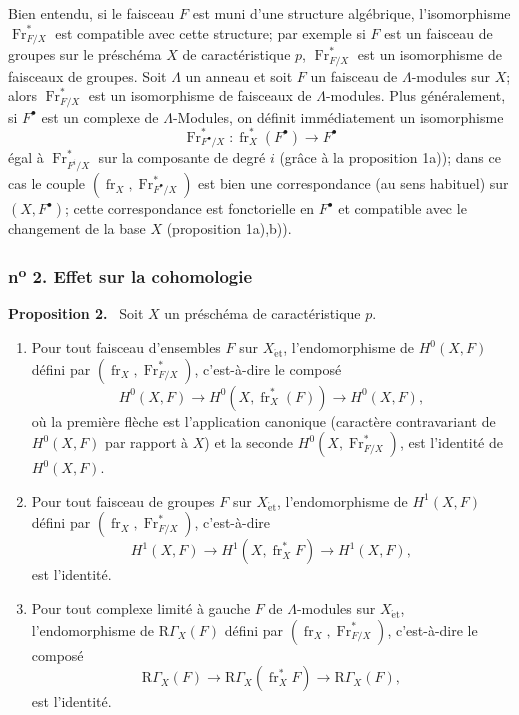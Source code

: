 \documentclass[11pt]{article}
\newenvironment{statement}[1]{\par\medskip\noindent\textbf{#1.}\ }{\par\medskip}
\newcommand{\R}{\mathrm{R}}\newcommand{\RHomCore}{\mathrm{RHom}}
\providecommand{\et}{\mathrm{\acute{e}t}}
\providecommand{\RGamma}{\R\Gamma}
\providecommand{\RGamma}{\R\Gamma}
\providecommand{\R}{\mathrm R}
\providecommand{\fr}{\operatorname{fr}}
\providecommand{\Fr}{\operatorname{Fr}}
\providecommand{\Fr}{\operatorname{Fr}}
\providecommand{\fr}{\operatorname{fr}}
\providecommand{\RGamma}{\R\Gamma}
\providecommand{\et}{\acute{e}t}
\begin{document}
Bien entendu, si le faisceau $F$ est muni d'une structure algébrique, l'isomorphisme $\Fr^*_{F/X}$ est compatible avec cette structure; par exemple si $F$ est un faisceau de groupes sur le préschéma $X$ de caractéristique $p$, $\Fr^*_{F/X}$ est un isomorphisme de faisceaux de groupes. Soit $\Lambda$ un anneau et soit $F$ un faisceau de $\Lambda$-modules sur $X$; alors $\Fr^*_{F/X}$ est un isomorphisme de faisceaux de $\Lambda$-modules. Plus généralement, si $F^\bullet$ est un complexe de $\Lambda$-Modules, on définit immédiatement un isomorphisme
\[
\Fr^*_{F^\bullet/X}:\fr_X^*(F^\bullet)\longrightarrow F^\bullet
\]
égal à $\Fr^*_{F^i/X}$ sur la composante de degré $i$ (grâce à la proposition 1a)); dans ce cas le couple $(\fr_X,\Fr^*_{F^\bullet/X})$ est bien une correspondance (au sens habituel) sur $(X,F^\bullet)$; cette correspondance est fonctorielle en $F^\bullet$ et compatible avec le changement de la base $X$ (proposition 1a),b)).

\subsubsection*{n\textsuperscript{o} 2. Effet sur la cohomologie}

\begin{statement}{Proposition 2}
Soit $X$ un préschéma de caractéristique $p$.
\begin{enumerate}[label=\alph*)]
\item Pour tout faisceau d'ensembles $F$ sur $X_{\et}$, l'endomorphisme de $H^0(X,F)$ défini par $(\fr_X,\Fr^*_{F/X})$, c'est-à-dire le composé
\[
H^0(X,F)\longrightarrow H^0(X,\fr_X^*(F))\longrightarrow H^0(X,F),
\]
où la première flèche est l'application canonique (caractère contravariant de $H^0(X,F)$ par rapport à $X$) et la seconde $H^0(X,\Fr^*_{F/X})$, est l'identité de $H^0(X,F)$.
\item Pour tout faisceau de groupes $F$ sur $X_{\et}$, l'endomorphisme de $H^1(X,F)$ défini par $(\fr_X,\Fr^*_{F/X})$, c'est-à-dire
\[
H^1(X,F)\longrightarrow H^1(X,\fr_X^*F)\longrightarrow H^1(X,F),
\]
est l'identité.
\item Pour tout complexe limité à gauche $F$ de $\Lambda$-modules sur $X_{\et}$, l'endomorphisme de $\RGamma_X(F)$ défini par $(\fr_X,\Fr^*_{F/X})$, c'est-à-dire le composé
\[
\RGamma_X(F)\longrightarrow \RGamma_X(\fr_X^*F)\longrightarrow \RGamma_X(F),
\]
est l'identité.
\end{enumerate}
\end{statement}
\end{document}
